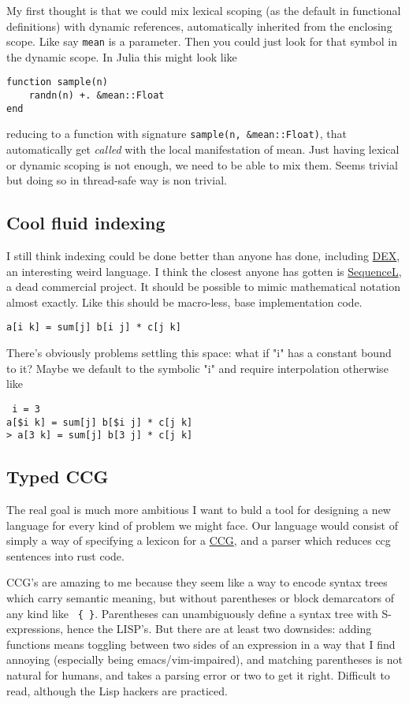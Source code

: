 \documentclass[onecolumn,10pt]{article}
\begin{document}
My first thought is that we could mix lexical scoping (as the default in functional definitions) with dynamic references, automatically inherited from the enclosing scope. Like say \texttt{mean} is a parameter. Then you could just look for that symbol in the dynamic scope. In Julia this might look like

\begin{verbatim}
function sample(n)
	randn(n) +. &mean::Float
end
\end{verbatim}
reducing to a function with signature \texttt{sample(n, \&mean::Float)}, that automatically get {\em called} with the local manifestation of mean. Just having lexical or dynamic scoping is not enough, we need to be able to mix them.  Seems trivial but doing so in thread-safe way is non trivial.

\subsection{Cool fluid indexing}
I still think indexing could be done better than anyone has done, including \href{https://openreview.net/pdf?id=rJxd7vsWPS}{DEX}, an interesting weird language. I think the closest anyone has gotten is \href{https://en.wikipedia.org/wiki/SequenceL}{SequenceL}, a dead commercial project. It should be possible to mimic mathematical notation almost exactly. Like this should be macro-less, base implementation code.
\begin{verbatim}
a[i k] = sum[j] b[i j] * c[j k]
\end{verbatim}
There's obviously problems settling this space: what if "i" has a constant bound to it? Maybe we default to the symbolic "i" and require interpolation otherwise like 
\begin{verbatim}
 i = 3
a[$i k] = sum[j] b[$i j] * c[j k]
> a[3 k] = sum[j] b[3 j] * c[j k]
\end{verbatim}

\subsection{Typed CCG}
The real goal is much more ambitious I want to buld a tool for designing a new language for every kind of problem we might face. Our language would consist of simply a way of specifying a lexicon for a \href{https://en.wikipedia.org/wiki/Combinatory_categorial_grammar}{CCG}, and a parser which reduces ccg sentences into rust code. 

CCG's are amazing to me because they seem like a way to encode syntax trees which carry semantic meaning, but without parentheses or block demarcators of any kind like \texttt{ \{ \}}. 
Parentheses can unambiguously define a syntax tree with S-expressions, hence the LISP's.
But there are at least two downsides: adding functions means toggling between two sides of an expression in a way that I find annoying (especially being emacs/vim-impaired), and matching parentheses is not natural for humans, and takes a parsing error or two to get it right.  Difficult to read, although the Lisp hackers are practiced.
\end{document}
